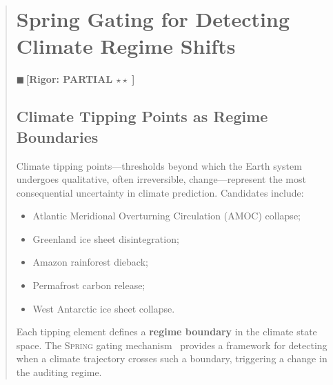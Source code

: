 \documentclass[11pt,a4paper]{article}
\theoremstyle{plain}
\theoremstyle{definition}
\theoremstyle{remark}
\newcommand{\rigorPartial}{{\color{rigorPartial}$\blacksquare$\,\textbf{[Rigor: PARTIAL $\star\star\;$]}}}
\newcommand{\Spring}{\textsc{Spring}}
\begin{document}
\begin{abstract}
\section{Spring Gating for Detecting Climate Regime Shifts}
\label{sec:spring-gating}
\rigorPartial
\subsection{Climate Tipping Points as Regime Boundaries}
Climate tipping points---thresholds beyond which the Earth system undergoes
qualitative, often irreversible, change---represent the most consequential
uncertainty in climate prediction. Candidates include:
\begin{itemize}[nosep]
  \item Atlantic Meridional Overturning Circulation (AMOC) collapse;
  \item Greenland ice sheet disintegration;
  \item Amazon rainforest dieback;
  \item Permafrost carbon release;
  \item West Antarctic ice sheet collapse.
\end{itemize}
Each tipping element defines a \textbf{regime boundary} in the climate state
space. The \Spring{} gating mechanism~\cite{spring_config} provides a framework
for detecting when a climate trajectory crosses such a boundary, triggering a
change in the auditing regime.

\end{abstract}
\end{document}

